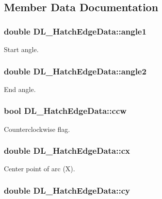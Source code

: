 \subsection{Member Data Documentation}
\hypertarget{structDL__HatchEdgeData_a8aaf90ec84f6676519eb8249aa598466}{
\subsubsection[{angle1}]{\setlength{\rightskip}{0pt plus 5cm}double D\-L\-\_\-\-Hatch\-Edge\-Data\-::angle1}}\label{structDL__HatchEdgeData_a8aaf90ec84f6676519eb8249aa598466}
Start angle. \hypertarget{structDL__HatchEdgeData_a8c1333618057dad82fcaa753026013ef}{
\subsubsection[{angle2}]{\setlength{\rightskip}{0pt plus 5cm}double D\-L\-\_\-\-Hatch\-Edge\-Data\-::angle2}}\label{structDL__HatchEdgeData_a8c1333618057dad82fcaa753026013ef}
End angle. \hypertarget{structDL__HatchEdgeData_a5890ff568b0337854d32adf3bef5645c}{
\subsubsection[{ccw}]{\setlength{\rightskip}{0pt plus 5cm}bool D\-L\-\_\-\-Hatch\-Edge\-Data\-::ccw}}\label{structDL__HatchEdgeData_a5890ff568b0337854d32adf3bef5645c}
Counterclockwise flag. \hypertarget{structDL__HatchEdgeData_a8ba08012de0f12f158cdc795e8321229}{
\subsubsection[{cx}]{\setlength{\rightskip}{0pt plus 5cm}double D\-L\-\_\-\-Hatch\-Edge\-Data\-::cx}}\label{structDL__HatchEdgeData_a8ba08012de0f12f158cdc795e8321229}
Center point of arc (X). \hypertarget{structDL__HatchEdgeData_ad2d8f9dca1aa2e97f2c1b823713aa977}{
\subsubsection[{cy}]{\setlength{\rightskip}{0pt plus 5cm}double D\-L\-\_\-\-Hatch\-Edge\-Data\-::cy}}\label{structDL__HatchEdgeData_ad2d8f9dca1aa2e97f2c1b823713aa977}
